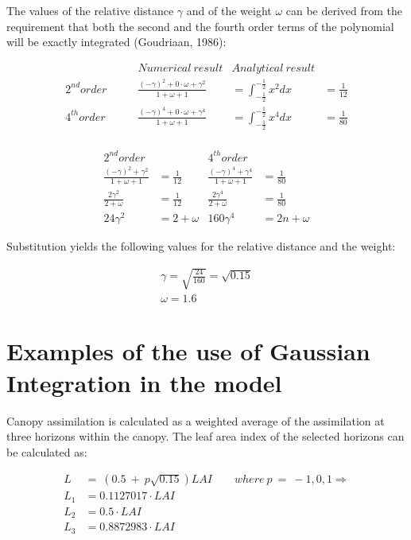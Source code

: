 The values of the relative distance $\gamma$ and of the weight $\omega$ can be derived from the
requirement that both the second and the fourth order terms of the polynomial will be
exactly integrated (Goudriaan, 1986):

\begin{align*}
  & Numerical \ result  & Analytical \ result\\
  2^{nd} order \qquad&  
    \frac{(-\gamma)^{2} + 0 \cdot \omega  + \gamma^{2}}{1+\omega +1} &= 
    \int_{-\frac{1}{2}}^{-\frac{1}{2}} x^2 dx &= \frac{1}{12}   \\
  4^{th} order \qquad&  
    \frac{(-\gamma)^{4} + 0 \cdot \omega +\gamma^{4} }{1 +\omega +1} &=
    \int_{-\frac{1}{2}}^{-\frac{1}{2}} x^4 dx &= \frac{1}{80}   \\
\end{align*}



\begin{align*}
 2^{nd} order & & 4^{th} order\\
 \frac{(-\gamma)^{2} + \gamma^{2}}{1 + \omega + 1} &= {\frac{1}{12}} &
 \frac{(-\gamma)^{4} + \gamma^{4}}{1 + \omega + 1} &= \frac{1}{80} \nonumber  \\
 \frac{2 \gamma^{2}}{2 + \omega} &= \frac{1}{12} & 
 \frac{2 \gamma^{4}}{2 + \omega} &= \frac{1}{80} \nonumber \\
 24 \gamma^{2} &= 2 + \omega  & 160 \gamma^{4} &= 2n+ \omega
\end{align*}

Substitution yields the following values for the relative distance and the weight:

\begin{align*}
\gamma =\sqrt{{\frac{24}{160}}} = \sqrt{0.15}  \\
\omega = 1.6
\end{align*}

\section*{Examples of the use of Gaussian Integration in the model}

Canopy assimilation is calculated as a weighted average of the assimilation at three
horizons within the canopy. The leaf area index of the selected horizons can be calculated
as:

\begin{align*}
 L &=~(0.5~+~p \sqrt{0.15} )LAI \qquad where \ p~=~-1,0,1 \Rightarrow  \\
L_{1} &= 0.1127017 \cdot LAI  \\
L_{2} &= 0.5 \cdot LAI   \\
L_{3} &= 0.8872983 \cdot LAI
\end{align*}

